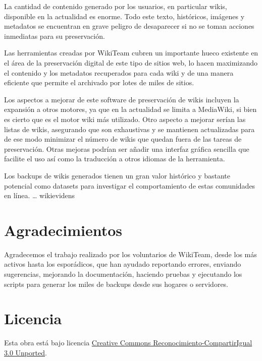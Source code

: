 \documentclass[11pt,twocolumn]{article}
\begin{document}
La cantidad de contenido generado por los usuarios, en particular wikis, disponible en la actualidad es enorme. Todo este texto, históricos, imágenes y metadatos se encuentran en grave peligro de desaparecer si no se toman acciones inmediatas para su preservación.

Las herramientas creadas por WikiTeam cubren un importante hueco existente en el área de la preservación digital de este tipo de sitios web, lo hacen maximizando el contenido y los metadatos recuperados para cada wiki y de una manera eficiente que permite el archivado por lotes de miles de sitios.

Los aspectos a mejorar de este software de preservación de wikis incluyen la expansión a otros motores, ya que en la actualidad se limita a MediaWiki, si bien es cierto que es el motor wiki más utilizado. Otro aspecto a mejorar serían las listas de wikis, asegurando que son exhaustivas y se mantienen actualizadas para de ese modo minimizar el número de wikis que quedan fuera de las tareas de preservación. Otras mejoras podrían ser añadir una interfaz gráfica sencilla que facilite el uso así como la traducción a otros idiomas de la herramienta.

Los backups de wikis generados tienen un gran valor histórico y bastante potencial como datasets para investigar el comportamiento de estas comunidades en línea. … wikievidens

        


\section*{Agradecimientos}

Agradecemos el trabajo realizado por los voluntarios de WikiTeam, desde los más activos hasta los esporádicos, que han ayudado reportando errores, enviando sugerencias, mejorando la documentación, haciendo pruebas y ejecutando los scripts para generar los miles de backups desde sus hogares o servidores.

\section*{Licencia}
Esta obra está bajo licencia \href{http://creativecommons.org/licenses/by-sa/3.0/}{Creative Commons Reconocimiento-CompartirIgual 3.0 Unported}.
\end{document}
